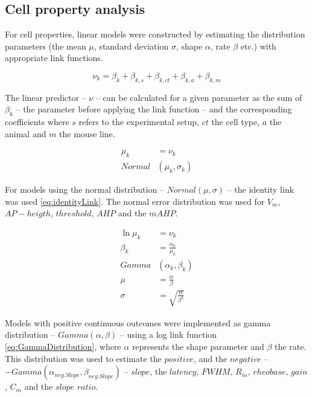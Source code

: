 \documentclass[
  12pt,
  a4paper,
  openany]{book}
\begin{document}
\hypertarget{cell-property-analysis}{%
\subsection{Cell property analysis}\label{cell-property-analysis}}

For cell properties, linear models were constructed by estimating the distribution parameters (the mean \(\mu\), standard deviation \(\sigma\), shape \(\alpha\), rate \(\beta\) etc.) with appropriate link functions.

\begin{equation}
\nu_{k} = \beta_{k} + \beta_{k,s} + \beta_{k,ct} + \beta_{k,a} + \beta_{k,m}
\label{eq:nu}
\end{equation}

\noindent
The linear predictor -- \(\nu\) -- can be calculated for a given parameter as the sum of \(\beta_{k}\) -- the parameter before applying the link function -- and the corresponding coefficients where \(s\) refers to the experimental setup, \(ct\) the cell type, \(a\) the animal and \(m\) the mouse line.

\begin{align}
\mu_{k } &= \nu_{k} \nonumber \\
Normal&(\mu_{k},\sigma_{k})
\label{eq:identityLink}
\end{align}

\noindent
For models using the normal distribution -- \(Normal(\mu,\sigma)\) -- the identity link was used \eqref{eq:identityLink}. The normal error distribution was used for \(V_{m}\), \(AP-heigth\), \(threshold\), \(AHP\) and the \(mAHP\).

\begin{align}
\ln{\mu_{k}} &= \nu_{k} \nonumber \\
\beta_{k} &= \frac{\alpha_{k}}{\mu_{k}} \nonumber \\
Gamma&(\alpha_{k},\beta_{k}) \nonumber \\
\mu &= \frac{\alpha}{\beta} \nonumber \\
\sigma &= \sqrt{\frac {\alpha }{\beta ^{2}}}
\label{eq:GammaDistribution}
\end{align}

\noindent
Models with positive continuous outcomes were implemented as gamma distribution -- \(Gamma(\alpha,\beta)\) -- using a log link function \eqref{eq:GammaDistribution}, where \(\alpha\) represents the shape parameter and \(\beta\) the rate. This distribution was used to estimate the \(positive\), and the \(negative\) -- \(-Gamma(\alpha_{neg.Slope},\beta_{neg.Slope})\) -- \(slope\), the \(latency\), \(FWHM\), \(R_{in}\), \(rheobase\), \(gain\), \(C_{m}\) and the \(slope\) \(ratio\).
\end{document}
